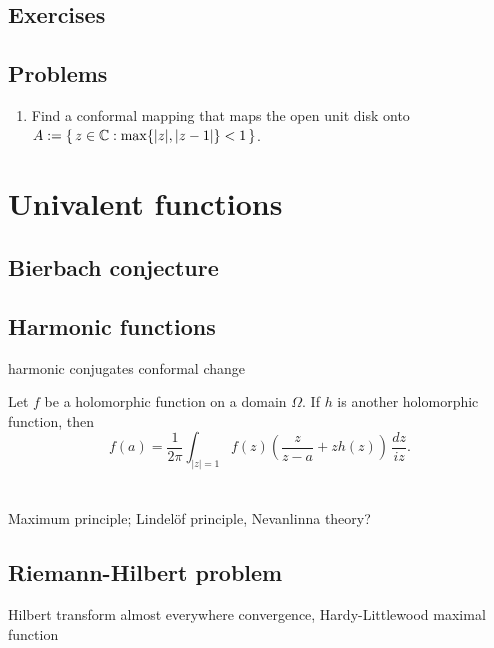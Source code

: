 \documentclass{../../large}
\begin{document}
\section*{Exercises}
\begin{prb}
\end{prb}
\begin{prb}
\end{prb}

\section*{Problems}
\begin{enumerate}
\item Find a conformal mapping that maps the open unit disk onto $A:=\{\,z\in\mathbb{C}:\max\{|z|,|z-1|\}<1\,\}$.
\end{enumerate}




\chapter{Univalent functions}
\section{Bierbach conjecture}
\section{Harmonic functions}
harmonic conjugates
conformal change
\begin{prb}
Let $f$ be a holomorphic function on a domain $\Omega$.
If $h$ is another holomorphic function, then
\[f(a)=\frac1{2\pi}\int_{|z|=1}f(z)\left(\frac z{z-a}+zh(z)\right)\,\frac{dz}{iz}.\]
\end{prb}





\chapter{}

Maximum principle; Lindelöf principle,
Nevanlinna theory?

\section{Riemann-Hilbert problem}
Hilbert transform
almost everywhere convergence, Hardy-Littlewood maximal function
\end{document}
